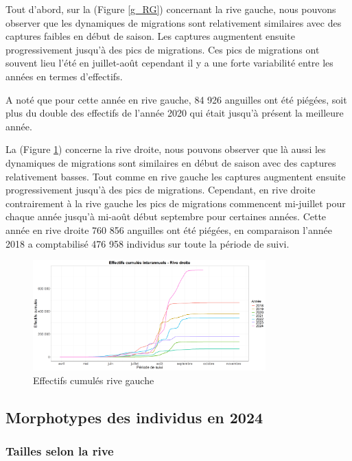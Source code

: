 \documentclass[11pt,titlepage,twoside]{article}\usepackage[]{graphicx}\usepackage[table]{xcolor}
\begin{document}
Tout d’abord, sur la (Figure \ref{g_RG}) concernant la rive gauche, nous pouvons observer que les dynamiques de migrations sont relativement similaires avec des captures faibles en début de saison. Les captures augmentent ensuite progressivement jusqu’à des pics de migrations.   Ces pics de migrations ont souvent lieu l’été en juillet-août cependant il y a une forte variabilité entre les années en termes d’effectifs.

A noté que pour cette année en rive gauche, 84 926 anguilles ont été piégées, soit plus du double des effectifs de l’année 2020 qui était jusqu’à présent la meilleure année.


La (Figure \ref{g_RD}) concerne la rive droite, nous pouvons observer que là aussi les dynamiques de migrations sont similaires en début de saison avec des captures relativement basses. Tout comme en rive gauche les captures augmentent ensuite progressivement jusqu’à des pics de migrations. Cependant, en rive droite contrairement à la rive gauche les pics de migrations commencent mi-juillet pour chaque année jusqu’à mi-août début septembre pour certaines années. Cette année en rive droite 760 856 anguilles ont été piégées, en comparaison l’année 2018 a comptabilisé 476 958 individus sur toute la période de suivi.

\begin{figure}[htpb]
\centering
\includegraphics[width=0.8\textwidth]{g_RD.png}
\caption{Effectifs cumulés rive gauche}
\label{g_RD}
\end{figure}


\subsection{Morphotypes des individus en 2024}

\subsubsection{Tailles selon la rive}
\end{document}
